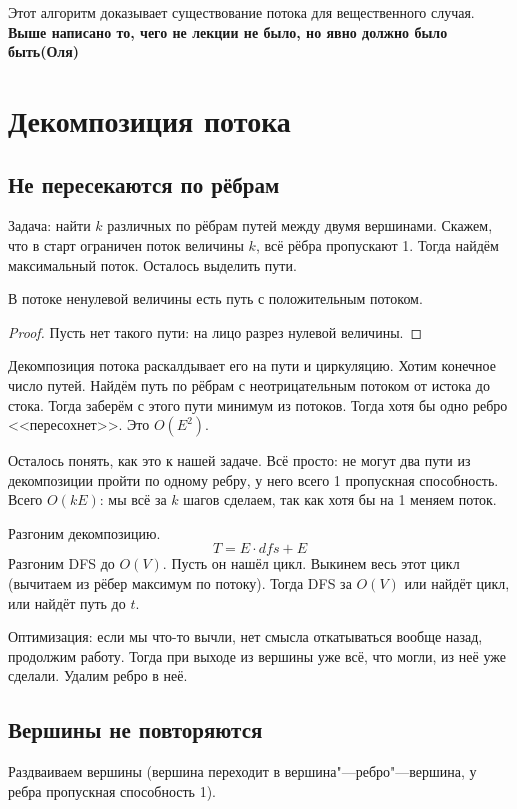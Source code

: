 Этот алгоритм доказывает существование потока для вещественного случая. 
\textbf{\Large Выше написано то, чего не лекции не было, но явно должно было быть(Оля)}

\section{Декомпозиция потока}

\subsection{Не пересекаются по рёбрам}

Задача: найти $k$ различных по рёбрам путей между двумя вершинами.
Скажем, что в старт ограничен поток величины $k$, всё рёбра пропускают 1.
Тогда найдём максимальный поток.
Осталось выделить пути.

\begin{lemma}
	В потоке ненулевой величины есть путь с положительным потоком.
\end{lemma}
\begin{proof}
	Пусть нет такого пути: на лицо разрез нулевой величины.
\end{proof}

Декомпозиция потока раскалдывает его на пути и циркуляцию.
Хотим конечное число путей.
Найдём путь по рёбрам с неотрицательным потоком от истока до стока.
Тогда заберём с этого пути минимум из потоков.
Тогда хотя бы одно ребро <<пересохнет>>.
Это $O(E^2)$.

Осталось понять, как это к нашей задаче.
Всё просто: не могут два пути из декомпозиции пройти по одному ребру, у него всего 1 пропускная способность.
Всего $O(kE)$: мы всё за $k$ шагов сделаем, так как хотя бы на 1 меняем поток.

Разгоним декомпозицию.
\[ T = E \cdot dfs + E \]
Разгоним DFS до $O(V)$.
Пусть он нашёл цикл.
Выкинем весь этот цикл (вычитаем из рёбер максимум по потоку).
Тогда DFS за $O(V)$ или найдёт цикл, или найдёт путь до $t$.

Оптимизация: если мы что-то вычли, нет смысла откатываться вообще назад, продолжим работу.
Тогда при выходе из вершины уже всё, что могли, из неё уже сделали.
Удалим ребро в неё.

\subsection{Вершины не повторяются}
Раздваиваем вершины (вершина переходит в вершина"---ребро"---вершина, у ребра пропускная способность 1).

